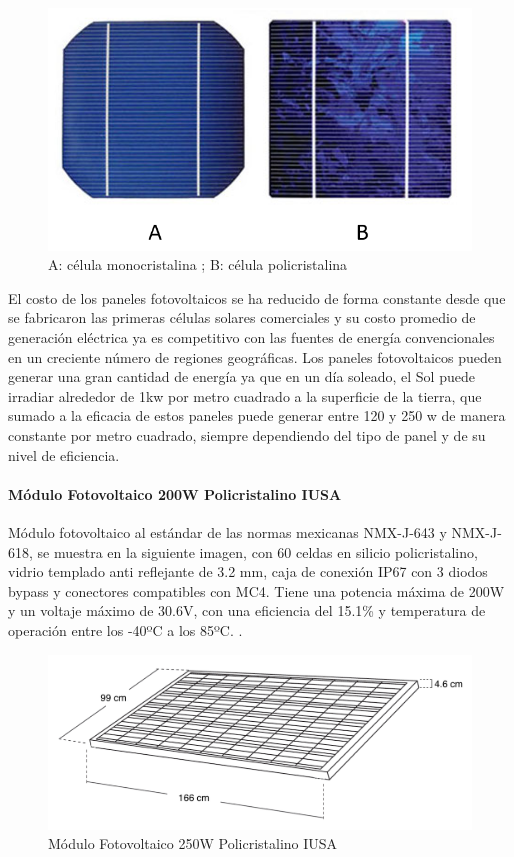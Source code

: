 \begin{figure}[H]
	\centering
	\includegraphics[scale=.50]{Capitulo2/images/tipospaneles.png}
	\caption{A: célula monocristalina ; B: célula policristalina}
	\label{fig:diagrama_dispensador}
\end{figure}

El costo de los paneles fotovoltaicos se ha reducido de forma constante desde que se fabricaron las primeras células solares comerciales y su costo promedio de generación eléctrica ya es competitivo con las fuentes de energía convencionales en un creciente número de regiones geográficas.
Los paneles fotovoltaicos pueden generar una gran cantidad de energía ya que en un día soleado, el Sol puede irradiar alrededor de 1kw por metro cuadrado a la superficie de la tierra, que sumado a la eficacia de estos paneles puede generar entre 120 y 250 w de manera constante por metro cuadrado, siempre dependiendo del tipo de panel y de su nivel de eficiencia.

\paragraph{Módulo Fotovoltaico 200W Policristalino IUSA}
Módulo fotovoltaico al estándar de las normas mexicanas NMX-J-643 y NMX-J-618, se muestra en la siguiente imagen, con 60 celdas en silicio policristalino, vidrio templado anti reflejante de 3.2 mm, caja de conexión IP67 con 3 diodos bypass y conectores compatibles con MC4.
Tiene una potencia máxima de 200W y un voltaje máximo de 30.6V, con una eficiencia del 15.1\% y temperatura de operación entre los -40ºC a los 85ºC. \citep{MarcoTeorico3}.

\begin{figure}[H]
	\centering
	\includegraphics[scale=.25]{Capitulo2/images/panel.png}
	\caption{Módulo Fotovoltaico 250W Policristalino IUSA}
	\label{fig:diagrama_dispensador}
\end{figure}

